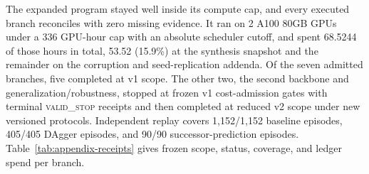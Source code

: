 The expanded program stayed well inside its compute cap, and every executed branch reconciles with zero missing evidence. It ran on 2 A100 80GB GPUs under a 336 GPU-hour cap with an absolute scheduler cutoff, and spent 68.5244 of those hours in total, 53.52 (15.9\%) at the synthesis snapshot and the remainder on the corruption and seed-replication addenda. Of the seven admitted branches, five completed at v1 scope. The other two, the second backbone and generalization/robustness, stopped at frozen v1 cost-admission gates with terminal \textsc{valid\_stop} receipts and then completed at reduced v2 scope under new versioned protocols. Independent replay covers 1,152/1,152 baseline episodes, 405/405 DAgger episodes, and 90/90 successor-prediction episodes. Table~\ref{tab:appendix-receipts} gives frozen scope, status, coverage, and ledger spend per branch.

